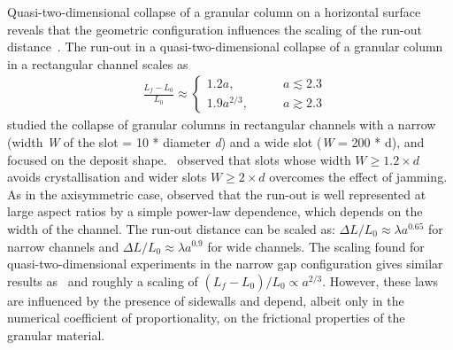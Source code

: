 
Quasi-two-dimensional collapse of a granular column on a horizontal 
surface reveals that the geometric configuration influences the scaling of the 
run-out distance~\citep{Lajeunesse2005}. The run-out in a 
quasi-two-dimensional collapse of a granular column in a rectangular channel 
scales as 
\begin{align}
& \frac{\textit{L}_{\textit{f}}- 
\textit{L}_{\textit{0}}}{\textit{L}_{\textit{0}}} \approx
\begin{cases} 
1.2\textit{a}, \qquad &\textit{a} \lesssim 2.3 \\
1.9\textit{a}^{2/3}, \qquad &\textit{a} \gtrsim 2.3
\end{cases}
\end{align} 
%
\citet{Balmforth2005} studied the collapse of granular columns in rectangular 
channels with a narrow (width \textit{W} of the slot = 10 * diameter 
\textit{d}) and a wide slot (\textit{W} = 200 * d), and focused on the deposit 
shape.~\citet{Lacaze2008} observed that slots whose width $W \ge1.2 \times d$ 
avoids crystallisation and wider slots $W \ge 2 \times d$ overcomes the effect 
of jamming. As in the
axisymmetric case, \citet{Balmforth2005} observed that the run-out is well 
represented at large aspect ratios by a 
simple power-law dependence, which depends on the width of the channel. The 
run-out distance can be scaled as: $\Delta \textit{L}/\textit{L}_{\textit{0}} 
\approx \lambda 
\textit{a}^{0.65}$ for 
narrow channels and $\Delta \textit{L}/\textit{L}_{\textit{0}} \approx \lambda 
\textit{a}^{0.9}$ for wide channels. The scaling found for 
quasi-two-dimensional experiments in the narrow gap 
configuration gives similar results as~\citet{Lube2005} and roughly a scaling 
of $({\textit{L}_{\textit{f}} - 
\textit{L}_{\textit{0}}})/\textit{L}_{\textit{0}} \propto \textit{a}^{2/3}$. 
However, these laws are 
influenced by the presence of sidewalls and depend, albeit only in the 
numerical coefficient of proportionality, on the frictional properties of the 
granular material. 

